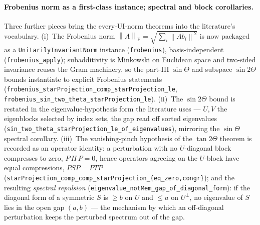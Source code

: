 \documentclass[11pt]{article}
\newcommand{\norm}[1]{\left\lVert #1\right\rVert}
\newcommand{\F}{\mathrm{F}}
\theoremstyle{remark}
\begin{document}
\paragraph{Frobenius norm as a first-class instance; spectral and
block corollaries.}  Three further pieces bring the every-UI-norm theorems
into the literature's vocabulary.  (i)~The Frobenius norm
$\norm{A}_{\F}=\sqrt{\sum_i\norm{A b_i}^2}$ is now packaged as a
\texttt{UnitarilyInvariantNorm} instance (\texttt{frobenius}), basis-independent
(\texttt{frobenius\_apply}); subadditivity is Minkowski on Euclidean space and
two-sided invariance reuses the Gram machinery, so the part-III $\sin\Theta$
and subspace $\sin2\Theta$ bounds instantiate to explicit Frobenius statements
(\texttt{frobenius\_starProjection\_comp\_starProjection\_le},
\texttt{frobenius\_sin\_two\_theta\_starProjection\_le}).  (ii)~The
$\sin2\Theta$ bound is restated in the eigenvalue-hypothesis form the
literature uses --- $U,V$ the eigenblocks selected by index sets, the gap read
off sorted eigenvalues (\texttt{sin\_two\_theta\_starProjection\_le\_of\_eigenvalues}),
mirroring the $\sin\Theta$ spectral corollary.  (iii)~The vanishing-pinch
hypothesis of the $\tan2\Theta$ theorem is recorded as an
operator identity: a perturbation with no $U$-diagonal block compresses to
zero, $P\,H\,P=0$, hence operators agreeing on the $U$-block have equal
compressions, $P S P=P T P$
(\texttt{starProjection\_comp\_comp\_starProjection\_\{eq\_zero,congr\}}); and
the resulting \emph{spectral repulsion}
(\texttt{eigenvalue\_notMem\_gap\_of\_diagonal\_form}): if the diagonal form of
a symmetric $S$ is $\ge b$ on $U$ and $\le a$ on $U^\perp$, no eigenvalue of
$S$ lies in the open gap $(a,b)$ --- the mechanism by which an off-diagonal
perturbation keeps the perturbed spectrum out of the gap.
\end{document}

